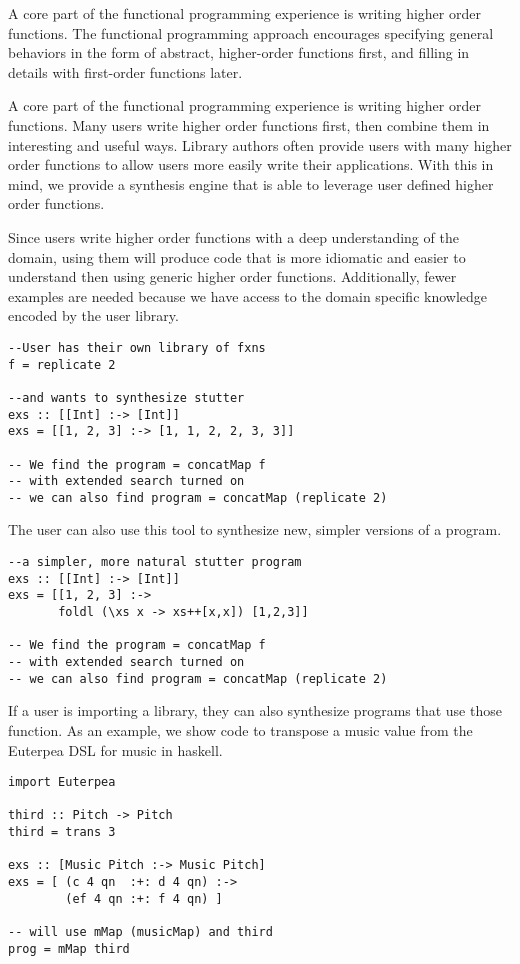 A core part of the functional programming experience is writing higher order functions. The functional programming approach encourages specifying general behaviors in the form of abstract, higher-order functions first, and filling in details with first-order functions later.

A core part of the functional programming experience is writing higher order functions. Many users write higher order functions first, then combine them in interesting and useful ways. Library authors often provide users with many higher order functions to allow users more easily write their applications. With this in mind, we provide a synthesis engine that is able to leverage user defined higher order functions.

Since users write higher order functions with a deep understanding of the domain, using them will produce code that is more idiomatic and easier to understand then using generic higher order functions. Additionally, fewer examples are needed because we have access to the domain specific knowledge encoded by the user library.

\begin{lstlisting}
--User has their own library of fxns
f = replicate 2

--and wants to synthesize stutter
exs :: [[Int] :-> [Int]]
exs = [[1, 2, 3] :-> [1, 1, 2, 2, 3, 3]]

-- We find the program = concatMap f
-- with extended search turned on
-- we can also find program = concatMap (replicate 2) 
\end{lstlisting}

The user can also use this tool to synthesize new, simpler versions of a program. 

\begin{lstlisting}
--a simpler, more natural stutter program
exs :: [[Int] :-> [Int]]
exs = [[1, 2, 3] :->
       foldl (\xs x -> xs++[x,x]) [1,2,3]]

-- We find the program = concatMap f
-- with extended search turned on
-- we can also find program = concatMap (replicate 2) 
\end{lstlisting}


If a user is importing a library, they can also synthesize programs that use those function. As an example, we show code to transpose a music value from the Euterpea DSL for music in haskell.

\begin{lstlisting}
import Euterpea

third :: Pitch -> Pitch
third = trans 3

exs :: [Music Pitch :-> Music Pitch]
exs = [ (c 4 qn  :+: d 4 qn) :->
        (ef 4 qn :+: f 4 qn) ]
        
-- will use mMap (musicMap) and third
prog = mMap third
\end{lstlisting}
